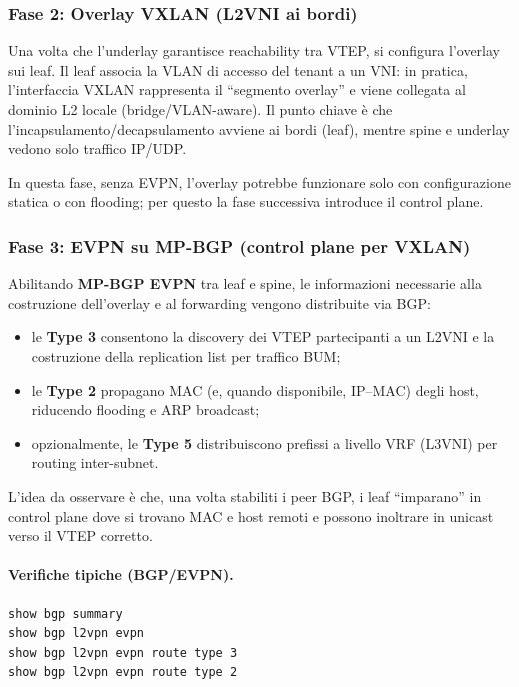 \subsubsection{Fase 2: Overlay VXLAN (L2VNI ai bordi)}

Una volta che l’underlay garantisce reachability tra VTEP, si configura l’overlay sui leaf.
Il leaf associa la VLAN di accesso del tenant a un VNI: in pratica, l’interfaccia VXLAN rappresenta il “segmento overlay” e viene collegata al dominio L2 locale (bridge/VLAN-aware). Il punto chiave è che l’incapsulamento/decapsulamento avviene ai bordi (leaf), mentre spine e underlay vedono solo traffico IP/UDP.

In questa fase, senza EVPN, l’overlay potrebbe funzionare solo con configurazione statica o con flooding; per questo la fase successiva introduce il control plane.

\subsubsection{Fase 3: EVPN su MP-BGP (control plane per VXLAN)}

Abilitando \textbf{MP-BGP EVPN} tra leaf e spine, le informazioni necessarie alla costruzione dell’overlay e al forwarding vengono distribuite via BGP:
\begin{itemize}
  \item le \textbf{Type 3} consentono la discovery dei VTEP partecipanti a un L2VNI e la costruzione della replication list per traffico BUM;
  \item le \textbf{Type 2} propagano MAC (e, quando disponibile, IP--MAC) degli host, riducendo flooding e ARP broadcast;
  \item opzionalmente, le \textbf{Type 5} distribuiscono prefissi a livello VRF (L3VNI) per routing inter-subnet.
\end{itemize}

L’idea da osservare è che, una volta stabiliti i peer BGP, i leaf “imparano” in control plane dove si trovano MAC e host remoti e possono inoltrare in unicast verso il VTEP corretto.

\paragraph{Verifiche tipiche (BGP/EVPN).}
\begin{verbatim}
show bgp summary
show bgp l2vpn evpn
show bgp l2vpn evpn route type 3
show bgp l2vpn evpn route type 2
\end{verbatim}

